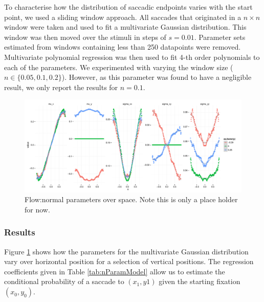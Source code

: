 \documentclass[a4paper, onecolumn, oneside, 11pt]{article}
\begin{document}
To characterise how the distribution of saccadic endpoints varies with the start point, we used a sliding window approach. All saccades that originated in a $n\times n$ window were taken and used to fit a multivariate Gaussian distribution. This window was then moved over the stimuli in steps of $s=0.01$. Parameter sets estimated from windows containing less than 250 datapoints were removed. Multivariate polynomial regression was then used to fit 4-th order polynomials to each of the parameters. We experimented with varying the window size ($n\in\{0.05,0.1, 0.2\}$). However, as this parameter was found to have a negligible result, we only report the results for $n=0.1$.

\begin{figure}
\centering
 \includegraphics[width=13cm]{../scripts/flow/figs/NparamsChagingOverSpace_ALL.pdf}
\caption{Flow:normal parameters over space. Note this is only a place holder for now. }
\label{fig:nParamsOverSpace}
\end{figure}

\subsubsection{Results}

Figure \ref{fig:nParamsOverSpace} shows how the parameters for the multivariate Gaussian distribution vary over horizontal position for a selection of vertical positions. The regression coefficients given in Table \ref{tab:nParamModel} allow us to estimate the conditional probability of a saccade to $(x_1, y1)$ given the starting fixation $(x_0, y_0)$.
\end{document}
